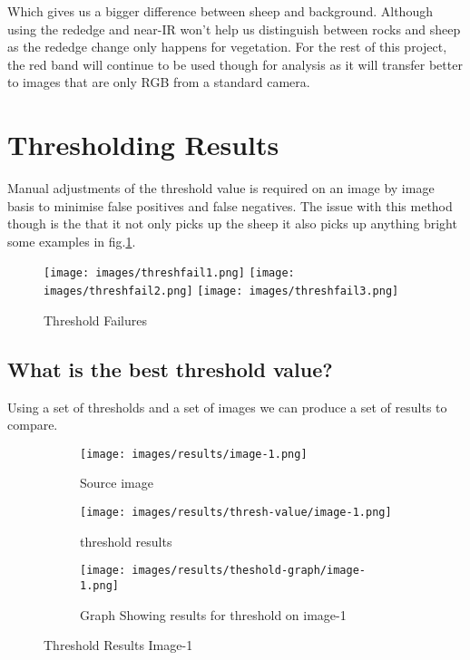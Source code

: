 Which gives us a bigger difference between sheep and background. Although using the rededge and near-IR  won't help us distinguish between rocks and sheep as the rededge change only happens for vegetation. For the rest of this project, the red band will continue to be used though for analysis as it will transfer better to images that are only RGB from a standard camera.

\clearpage
\section{Thresholding Results}

Manual adjustments of the threshold value is required on an image by image basis to minimise false positives and false negatives. The issue with this method though is the that it not only picks up the sheep it also picks up anything bright some examples in fig.\ref{fig:threshfailures}.
    
    \begin{figure}
        \centering
        \texttt{[image: images/threshfail1.png]}
        \texttt{[image: images/threshfail2.png]}
        \texttt{[image: images/threshfail3.png]}
        \caption{Threshold Failures}
        \label{fig:threshfailures}
    \end{figure}
    
\subsection{What is the best threshold value?}

Using a set of thresholds and a set of images we can produce a set of results to compare.

\begin{figure}[H]
    \centering

\begin{subfigure}{.5\textwidth}
    \centering
    \texttt{[image: images/results/image-1.png]}
    \caption{Source image}

\end{subfigure}%
\begin{subfigure}{.5\textwidth}
\centering
    \texttt{[image: images/results/thresh-value/image-1.png]}
    \caption{threshold results}

\end{subfigure}
\begin{subfigure}{.9\textwidth}
\centering
    \texttt{[image: images/results/theshold-graph/image-1.png]}
    \caption{Graph Showing results for threshold on image-1}
\end{subfigure}%

    \caption{Threshold Results Image-1}
    \label{fig:Threshold-Results-Image-1}
\end{figure}

